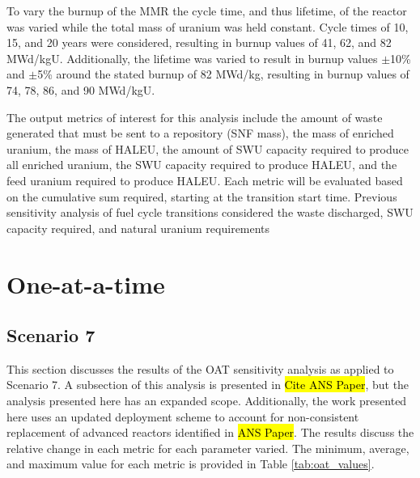 To vary the burnup of the \gls{MMR} the cycle time, and thus lifetime, of 
the reactor was varied while the total mass of uranium was held constant. 
Cycle times of 10, 15, and 20 years were considered, resulting in burnup 
values of 41, 62, and 82 MWd/kgU. Additionally, the lifetime was varied to 
result in burnup values $\pm$10\% and $\pm$5\% around the stated burnup of 
82 MWd/kg, resulting in burnup values of 74, 78, 86, and 90 MWd/kgU. 

The output metrics of 
interest for this analysis include the amount of waste generated that 
must be sent to a repository (\gls{SNF} mass), the mass of enriched uranium, 
the mass of \gls{HALEU},
the amount of \gls{SWU} capacity required to produce all enriched uranium, the 
\gls{SWU} capacity required to produce \gls{HALEU}, and the feed uranium 
required to produce \gls{HALEU}. Each metric will be evaluated based on the 
cumulative sum required, starting at the transition start time. Previous 
sensitivity analysis of fuel cycle transitions considered the waste 
discharged, \gls{SWU} 
capacity required, and natural uranium requirements
\cite{richards_application_2021,feng_sensitivity_2020} 


\section{One-at-a-time}
\subsection{Scenario 7}
This section discusses the results of the \gls{OAT} sensitivity analysis 
as applied to Scenario 7. A subsection of this analysis is presented 
in \hl{Cite ANS Paper}, but the analysis presented here has an expanded scope. 
Additionally, the work presented here uses an updated deployment scheme to 
account for non-consistent replacement of advanced reactors identified in 
\hl{ANS Paper}. The results discuss
the relative change in each metric for each parameter varied. The minimum, 
average, and maximum value for each metric is provided in Table 
\ref{tab:oat_values}.

